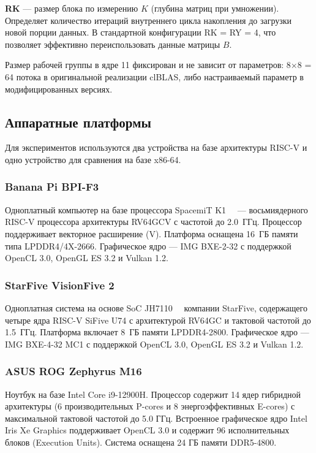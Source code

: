 \textbf{RK} --- размер блока по измерению $K$ (глубина матриц при умножении). Определяет количество итераций внутреннего цикла накопления до загрузки новой порции данных. В стандартной конфигурации RK = RY = 4, что позволяет эффективно переиспользовать данные матрицы $B$.

Размер рабочей группы в ядре 11 фиксирован и не зависит от параметров: 8×8 = 64 потока в оригинальной реализации clBLAS, либо настраиваемый параметр в модифицированных версиях.

\subsection{Аппаратные платформы}

Для экспериментов используются два устройства на базе архитектуры RISC-V и одно устройство для сравнения на базе x86-64.

\subsubsection{Banana Pi BPI-F3}

Одноплатный компьютер на базе процессора SpacemiT K1~\cite{spacemit2024}~\cite{bananapi_f3_wiki} — восьмиядерного RISC-V процессора архитектуры RV64GCV с частотой до 2.0~ГГц. Процессор поддерживает векторное расширение (V). Платформа оснащена 16~ГБ памяти типа LPDDR4/4X-2666. Графическое ядро — IMG BXE-2-32 с поддержкой OpenCL 3.0, OpenGL ES 3.2 и Vulkan 1.2.

\subsubsection{StarFive VisionFive 2}

Одноплатная система на основе SoC JH7110~\cite{starfive2023datasheet}~\cite{visionfive2_wiki} компании StarFive, содержащего четыре ядра RISC-V SiFive U74 с архитектурой RV64GC и тактовой частотой до 1.5~ГГц. Платформа включает 8~ГБ памяти LPDDR4-2800. Графическое ядро — IMG BXE-4-32 MC1 с поддержкой OpenCL 3.0, OpenGL ES 3.2 и Vulkan 1.2.

\subsubsection{ASUS ROG Zephyrus M16}

Ноутбук на базе Intel Core i9-12900H. Процессор содержит 14 ядер гибридной архитектуры (6 производительных P-cores и 8 энергоэффективных E-cores) с максимальной тактовой частотой до 5.0 ГГц. Встроенное графическое ядро Intel Iris Xe Graphics поддерживает OpenCL 3.0 и содержит 96 исполнительных блоков (Execution Units). Система оснащена 24 ГБ памяти DDR5-4800.


